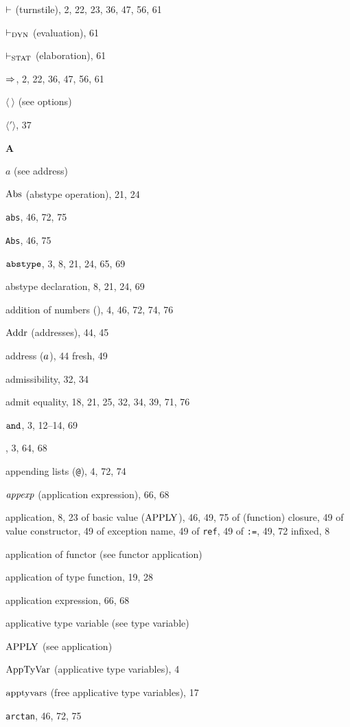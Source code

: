 \begin{theindex}
\item $\vdash$ (turnstile), 2, 22, 23, 36, 47, 56, 61
\item $\vdash_{\rm DYN}$ (evaluation), 61
\item $\vdash_{\rm STAT}$ (elaboration), 61
\item $\Rightarrow$, 2, 22, 36, 47, 56, 61
\item $\langle\ \rangle$ (see options) 
\item $\langle'\rangle$, 37
\indexspace
\parbox{65mm}{\hfil{\large\bf A}\hfil}
\indexspace
\item $a$ (see address) 
\item $\mathop{\rm Abs}\nolimits$ (abstype operation), 21, 24
\item {\tt abs}, 46, 72, 75
\item {\tt Abs}, 46, 75
\item ${\tt abstype}$, 3, 8, 21, 24, 65, 69
\item abstype declaration, 8, 21, 24, 69
\item addition of numbers (\ml{+}), 4, 46, 72, 74, 76
\item ${\rm Addr}$ (addresses), 44, 45
\item address ($a$), 44
\subitem fresh, 49
\item admissibility, 32, 34
\item admit equality, 18, 21, 25, 32, 34, 39, 71, 76
\item ${\tt and}$, 3, 12--14, 69
\item \ANDALSO, 3, 64, 68
\item appending lists (\verb+@+), 4, 72, 74
\item ${\it appexp}$ (application expression), 66, 68
\item application, 8, 23
\subitem of basic value (${\rm APPLY}$), 46, 49, 75
\subitem of (function) closure, 49
\subitem of value constructor, 49
\subitem of exception name, 49
\subitem of {\tt ref}, 49
\subitem of {\tt :=}, 49, 72
\subitem infixed, 8
\item application of functor (see functor application) 
\item application of type function, 19, 28
\item application expression, 66, 68
\item applicative type variable (see type variable) 
\item ${\rm APPLY}$ (see application) 
\item ${\rm AppTyVar}$ (applicative type variables), 4
\item $\mathop{\rm apptyvars}\nolimits$ (free applicative type variables), 17
\item {\tt arctan}, 46, 72, 75

\end{theindex}
